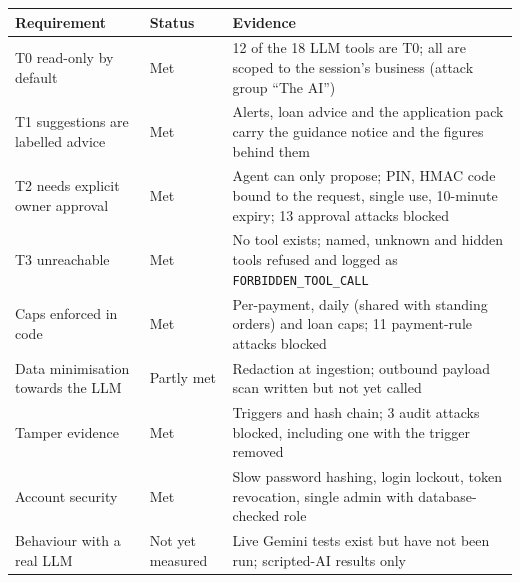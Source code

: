 \documentclass[10pt,a4paper]{article}
\newcommand{\code}[1]{\texttt{\small #1}}
\begin{document}
\begin{center}
\begin{tabularx}{\textwidth}{@{}p{3.6cm}p{1.5cm}Y@{}}
\toprule
\textbf{Requirement} & \textbf{Status} & \textbf{Evidence}\\
\midrule
T0 read-only by default & Met & 12 of the 18 LLM tools are T0; all are scoped to the session's business (attack group ``The AI'')\\
T1 suggestions are labelled advice & Met & Alerts, loan advice and the application pack carry the guidance notice and the figures behind them\\
T2 needs explicit owner approval & Met & Agent can only propose; PIN, HMAC code bound to the request, single use, 10-minute expiry; 13 approval attacks blocked\\
T3 unreachable & Met & No tool exists; named, unknown and hidden tools refused and logged as \code{FORBIDDEN\_TOOL\_CALL}\\
Caps enforced in code & Met & Per-payment, daily (shared with standing orders) and loan caps; 11 payment-rule attacks blocked\\
Data minimisation towards the LLM & Partly met & Redaction at ingestion; outbound payload scan written but not yet called\\
Tamper evidence & Met & Triggers and hash chain; 3 audit attacks blocked, including one with the trigger removed\\
Account security & Met & Slow password hashing, login lockout, token revocation, single admin with database-checked role\\
Behaviour with a real LLM & Not yet measured & Live Gemini tests exist but have not been run; scripted-AI results only\\
\bottomrule
\end{tabularx}
\end{center}
\end{document}
